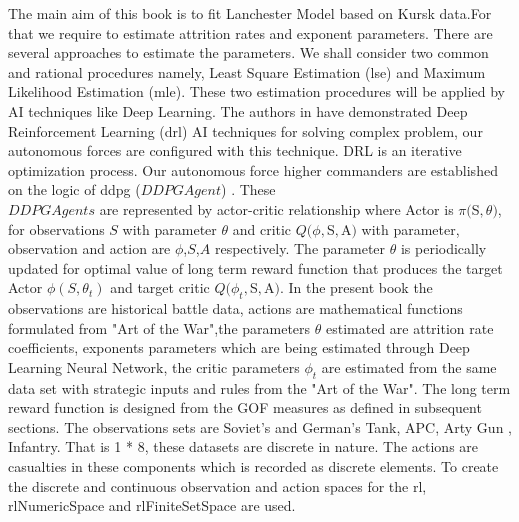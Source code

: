 \documentclass[]{article}
\begin{document}
	The main aim of this book is to fit Lanchester Model based on Kursk data.For that we require to estimate attrition rates and exponent parameters. There are several approaches to estimate the parameters. We shall consider two common and rational procedures namely, Least Square Estimation (\acrshort{lse}) and Maximum Likelihood Estimation (\acrshort{mle}). These two estimation procedures will be applied by AI techniques like Deep Learning. The authors in \autocite{lillicrap2019continuous} have demonstrated Deep Reinforcement Learning (\acrshort{drl}) AI techniques for solving complex problem, our autonomous forces are configured with this technique. DRL is an iterative optimization process. Our autonomous force higher commanders are established on the logic of \acrlong{ddpg} ($DDPGAgent$) \autocite{lillicrap2019continuous}. These\\ $DDPGAgents$ are represented by {actor-critic} relationship where Actor is $\pi($S$,\theta)$, for observations $S$ with parameter $\theta$ and critic $Q(\phi,$S$,$A$)$ with parameter, observation and action are $\phi$,$S$,$A$ respectively. The parameter $\theta$ is periodically updated for optimal value of long term reward function that produces the target Actor $\phi(S,\theta_t)$ and target critic $Q(\phi_t,$S$,$A$)$. In the present book the observations are historical battle data, actions are mathematical functions formulated from "Art of the War"\autocite{tzu2020art},the parameters $\theta$ estimated are attrition rate coefficients, exponents parameters which are being estimated through Deep Learning Neural Network, the critic parameters $\phi_t$ are estimated from the same data set with strategic inputs and rules from the "Art of the War". The long term reward function is designed from the GOF measures as defined in subsequent sections.
 The observations sets are Soviet's and German's Tank, APC, Arty Gun , Infantry. That is {1 * 8}, these datasets are discrete in nature. The actions are casualties in these components which is recorded as discrete elements. To create the discrete and continuous observation and action spaces for the \acrshort{rl}, \Gls{rlNumericSpace} and \Gls{rlFiniteSetSpace} are used.   

 
\end{document}
